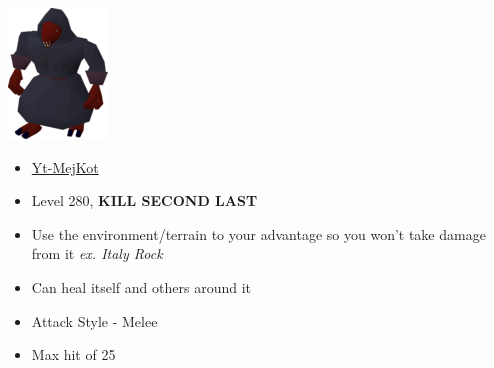 \documentclass{article}
\begin{document}
\begin{multicols}{2}
  \null \vfill
  \includegraphics[width=.3\textwidth]{yt.png}
  \vfill \null
\columnbreak
  \null \vfill
  \begin{itemize}
    \item \underline{Yt-MejKot}
    \item Level 280, \textbf{KILL SECOND LAST}
    \item Use the environment/terrain to your advantage so you won't take damage from it \textit{ex. Italy Rock}
    \item Can heal itself and others around it
    \item Attack Style - Melee
    \item Max hit of 25
  \end{itemize}
  \vfill \null
\end{multicols}
\newpage
\end{document}
